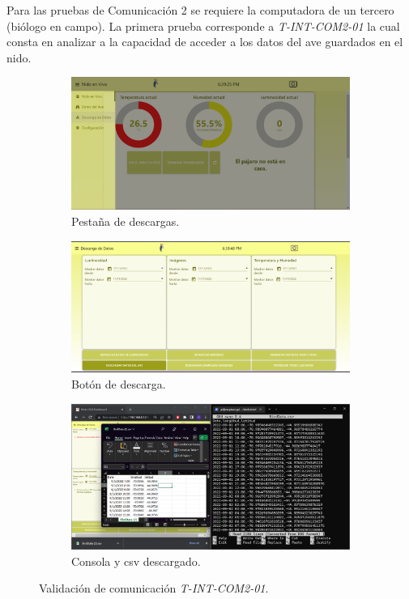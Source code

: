 Para las pruebas de Comunicación 2 se requiere la computadora de un tercero (biólogo en campo). La primera prueba corresponde a \textit{T-INT-COM2-01} la cual consta en analizar a la capacidad de acceder a los datos del ave guardados en el nido.
\begin{figure}[H]
\centering
	\begin{subfigure}{0.49\textwidth}
		\centering
		\includegraphics[width=\linewidth]{ImagenesValidacion del prototipo/TINTCOM21a}		
		\caption{Pestaña de descargas.}
	\end{subfigure}\hfill
	\begin{subfigure}{0.49\textwidth}
		\centering
		\includegraphics[width=\linewidth]{ImagenesValidacion del prototipo/TINTCOM21b}
		\caption{Botón de descarga.}
	\end{subfigure}
	\caption*{}
\end{figure}
\begin{figure}[H]
	\ContinuedFloat
	\centering
	\begin{subfigure}{\textwidth}
		\centering
		\includegraphics[width=0.8\linewidth]{ImagenesValidacion del prototipo/TINTCOM21}
		\caption{Consola y csv descargado.}
	\end{subfigure}
	\caption{Validación de comunicación \textit{T-INT-COM2-01}.}
\end{figure}

